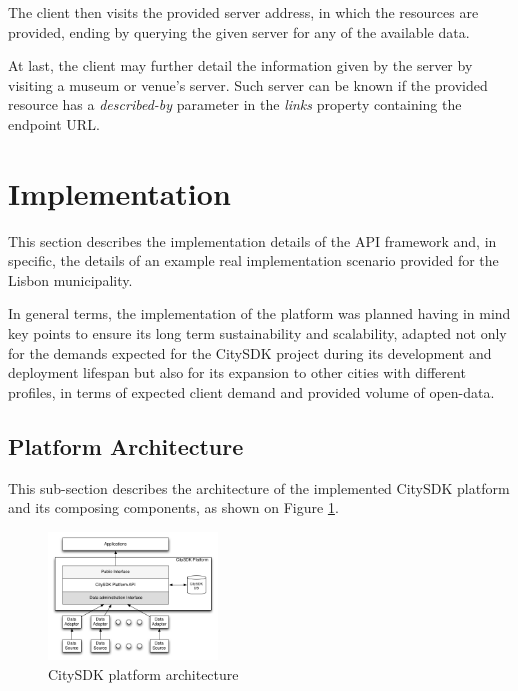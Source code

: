 \documentclass[times]{ettauth}
\begin{document}
The client then visits the provided server address, in which the resources are provided, ending by querying the given server for any of the available data. 

At last, the client may further detail the information given by the server by visiting a museum or venue's server. Such server can be known if the provided resource has a \textit{described-by} parameter in the \textit{links} property containing the endpoint URL.

\section{Implementation}
This section describes the implementation details of the API framework and, in specific, the details of an example real implementation scenario provided for the Lisbon municipality. 

In general terms, the implementation of the platform was planned having in mind key points to ensure its long term sustainability and scalability, adapted not only for the demands expected for the CitySDK project during its development and deployment lifespan but also for its expansion to other cities with different profiles, in terms of expected client demand and provided volume of open-data.

\subsection{Platform Architecture}
This sub-section describes the architecture of the implemented CitySDK platform and its composing components, as shown on Figure \ref{fig:architecture}. 

\begin{figure}[!ht]
\centering
\includegraphics[width=0.4\textwidth]{images/architecture}
\caption{CitySDK platform architecture}
\label{fig:architecture}
\end{figure}
\end{document}
